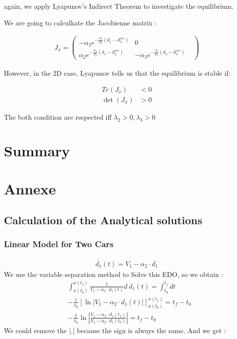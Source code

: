 \documentclass{article}
\begin{document}
	again, we apply Lyapunov's Indirect Theorem to investigate the equilibrium.
	
	
	We are going to calculkate the Jacobienne matrix : 
	
	\begin{align*}
		J_{\bar{x}}=\begin{pmatrix}
			-\alpha_2e^{-\frac{\alpha_2}{V_2}(d_1 - d_{2}^{sec})} & 0 & \\
			\alpha_2e^{-\frac{\alpha_2}{V_2}(d_1 - d_{2}^{sec})} & -\alpha_3e^{-\frac{\alpha_3}{V_3}(d_2 - d_{3}^{sec})} &
		\end{pmatrix}
	\end{align*}
	
	However, in the 2D case, Lyapunov tells us that the equilibrium is stable if:
	
	\[
	\boxed{
		\begin{aligned}
			Tr(J_{\bar{x}}) &< 0 \\
			\det(J_{\bar{x}}) &> 0
		\end{aligned}
	}
	\]

	The both condition are respected iff $\lambda_2>0, \lambda_3>0$
	\section{Summary}
	
	\section{Annexe}
	
	\subsection{Calculation of the Analytical solutions}
	
	\subsubsection{Linear Model for Two Cars}
	
	\label{eq:EDO1}
	\begin{align*} 
		\dot{d_1}(t) = V_1 - \alpha_2 \cdot d_1
	\end{align*}
	We use the variable separation method to Solve this EDO, so we obtain : 
	\begin{align*} 
		&\int_{x(t_0)}^{x(t_f)} \frac{1}{V_1 - \alpha_2 \cdot d_1(t)} d \ d_1(t) = \int_{t_0}^{t_f} dt \\
		&-\frac{1}{\lambda_2} \left[ \ln\left| V_1 - \alpha_2 \cdot d_1(t) \right| \right]_{x(t_0)}^{x(t_f)} = t_f-t_0 \\
		&-\frac{1}{\lambda_2} \ln\left| \frac{V_1 - \alpha_2 \cdot d_1(t_f)}{V_1 - \alpha_2 \cdot d_1(t_0)} \right| = t_f-t_0
	\end{align*}
	We could remove the |.| because the sign is always the same. And we get : 
	
\end{document}
